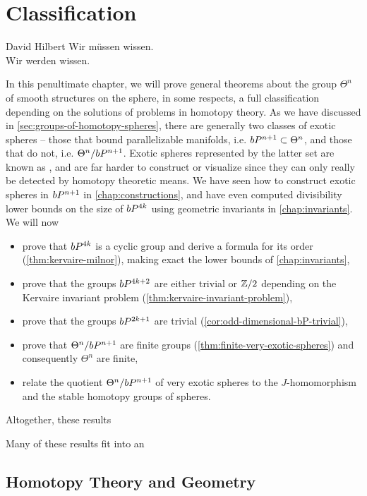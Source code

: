 \chapter{Classification}\label{chap:classification}

\begin{epigraph}{8.6em}{David Hilbert}
	Wir m\"ussen wissen.\\
	Wir werden wissen.
\end{epigraph}

In this penultimate chapter, we will prove general theorems about the group $\Theta^n$ of smooth structures on the sphere, in some respects, a full classification depending on the solutions of problems in homotopy theory. As we have discussed in \cref{sec:groups-of-homotopy-spheres}, there are generally two classes of exotic spheres -- those that bound parallelizable manifolds, i.e. $bP^{n+1}\subset \Theta^n$, and those that do not, i.e. $\Theta^n/bP^{n+1}$.
Exotic spheres represented by the latter set are known as , and are far harder to construct or visualize since they can only really be detected by homotopy theoretic means.
We have seen how to construct exotic spheres in $bP^{n+1}$ in \cref{chap:constructions}, and have even computed divisibility lower bounds on the size of $bP^{4k}$ using geometric invariants in \cref{chap:invariants}. We will now
\begin{itemize}
	\item prove that $bP^{4k}$ is a cyclic group and derive a formula for its order (\cref{thm:kervaire-milnor}), making exact the lower bounds of \cref{chap:invariants},
	\item prove that the groups $bP^{4k+2}$ are either trivial or $\mathbb{Z}/2$ depending on the Kervaire invariant problem (\cref{thm:kervaire-invariant-problem}),
	\item prove that the groups $bP^{2k+1}$ are trivial (\cref{cor:odd-dimensional-bP-trivial}),
	\item prove that $\Theta^n/bP^{n+1}$ are finite groups (\cref{thm:finite-very-exotic-spheres}) and consequently $\Theta^n$ are finite,
	\item relate the quotient $\Theta^n/bP^{n+1}$ of very exotic spheres to the $J$-homomorphism and the stable homotopy groups of spheres.
\end{itemize}
Altogether, these results

Many of these results fit into an 

\pagebreak
\section{Homotopy Theory and Geometry}

